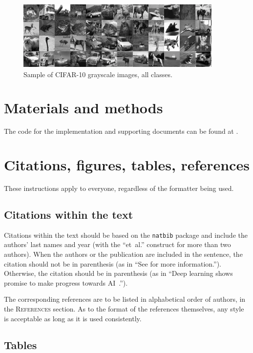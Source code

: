 \documentclass{article} %
\begin{document}
\begin{figure}[h]
\begin{center}
\includegraphics{CIFAR10All1024Original.png}
\end{center}
\caption{Sample of CIFAR-10 grayscale images, all classes.}
\end{figure}

\section{Materials and methods}\label{materials}
The code for the implementation and supporting documents can be found at \citet{Stelling:aa}.

\section{Citations, figures, tables, references}
\label{others}

These instructions apply to everyone, regardless of the formatter being used.

\subsection{Citations within the text}


Citations within the text should be based on the \texttt{natbib} package
and include the authors' last names and year (with the ``et~al.'' construct
for more than two authors). When the authors or the publication are
included in the sentence, the citation should not be in parenthesis (as
in ``See \citet{Goodfellow:2016aa} for more information.''). Otherwise, the citation
should be in parenthesis (as in ``Deep learning shows promise to make progress towards AI~\citep{Goodfellow:2016aa}.'').

The corresponding references are to be listed in alphabetical order of
authors, in the \textsc{References} section. As to the format of the
references themselves, any style is acceptable as long as it is used
consistently.


\subsection{Tables}
\end{document}
